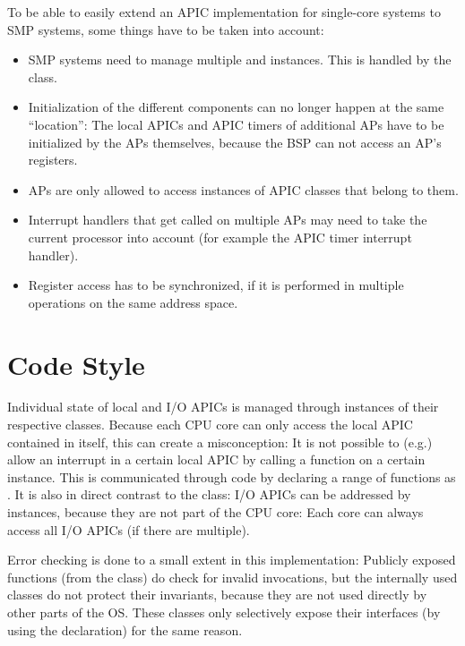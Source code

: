 To be able to easily extend an APIC implementation for single-core systems to SMP systems, some
things have to be taken into account:

\begin{itemize}
  \item SMP systems need to manage multiple  and  instances. This is
        handled by the  class.
  \item Initialization of the different components can no longer happen at the same ``location'': The local
        APICs and APIC timers of additional APs have to be initialized by the APs themselves, because the
        BSP can not access an AP's registers.
  \item APs are only allowed to access instances of APIC classes that belong to them.
  \item Interrupt handlers that get called on multiple APs may need to take the current processor into
        account (for example the APIC timer interrupt handler).
  \item Register access has to be synchronized, if it is performed in multiple operations on the same
        address space.
\end{itemize}

\section{Code Style}
\label{sec:codestyle}

Individual state of local and I/O APICs is managed through instances of their respective classes.
Because each CPU core can only access the local APIC contained in itself, this can create a
misconception: It is not possible to (e.g.) allow an interrupt in a certain local APIC by calling a
function on a certain  instance. This is communicated through code by declaring a
range of functions as . It is also in direct contrast to the  class: I/O
APICs can be addressed by instances, because they are not part of the CPU core: Each core can
always access all I/O APICs (if there are multiple).

Error checking is done to a small extent in this implementation: Publicly exposed functions (from
the  class) do check for invalid invocations, but the internally used classes do not
protect their invariants, because they are not used directly by other parts of the OS. These
classes only selectively expose their interfaces (by using the  declaration) for the
same reason.

